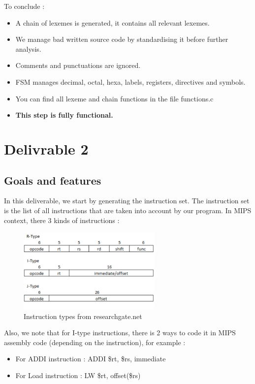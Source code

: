 \documentclass[twoside,twocolumn]{article}
\begin{document}
To conclude :
\begin{itemize}
 \item A chain of lexemes is generated, it contains all relevant lexemes.
 \item We manage bad written source code by standardising it before further analysis.
 \item Comments and punctuations are ignored.
 \item FSM manages decimal, octal, hexa, labels, registers, directives and symbols.
 \item You can find all lexeme and chain functions in the file functions.c
 \item \textbf{This step is fully functional.}
\end{itemize}



\section{Delivrable 2}

\subsection{Goals and features}
In this deliverable, we start by generating the instruction set. The instruction set is the list of all instructions that are taken into account by our program. In MIPS context, there 3 kinds of instructions :

\begin{figure}[h!]
\begin{center}
\includegraphics[width=7cm]{images/instType.png} 
\end{center}
\caption{Instruction types from researchgate.net}
\label{instType}
\end{figure}

Also, we note that for I-type instructions, there is 2 ways to code it in MIPS assembly code (depending on the instruction), for example : 

\begin{itemize}
 \item For ADDI instruction : ADDI \$rt, \$rs, immediate
 \item For Load instruction : LW \$rt, offset(\$rs)
\end{itemize}
\end{document}
